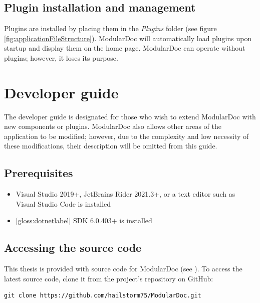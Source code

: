 \subsection{Plugin installation and management}

Plugins are installed by placing them in the \textit{Plugins} folder (see figure \ref{fig:applicationFileStructure}). ModularDoc will automatically load plugins upon startup and display them on the home page. ModularDoc can operate without plugins; however, it loses its purpose.

\section{Developer guide}

The developer guide is designated for those who wish to extend ModularDoc with new components or plugins.
ModularDoc also allows other areas of the application to be modified; however, due to the complexity and low necessity of these modifications, their description will be omitted from this guide.

\subsection{Prerequisites}

\begin{itemize}
    \item Visual Studio 2019+, JetBrains Rider 2021.3+, or a text editor such as Visual Studio Code is installed
    \item \ref{gloss:dotnetlabel} SDK 6.0.403+ is installed
\end{itemize}

\subsection{Accessing the source code} \label{subsec:accessingSourceCode}

This thesis is provided with source code for ModularDoc (see ).
To access the latest source code, clone it from the project's repository on GitHub:

\begin{lstlisting}[caption=Script for cloning the ModularDoc project GitHub repository]
    git clone https://github.com/hailstorm75/ModularDoc.git
\end{lstlisting}

